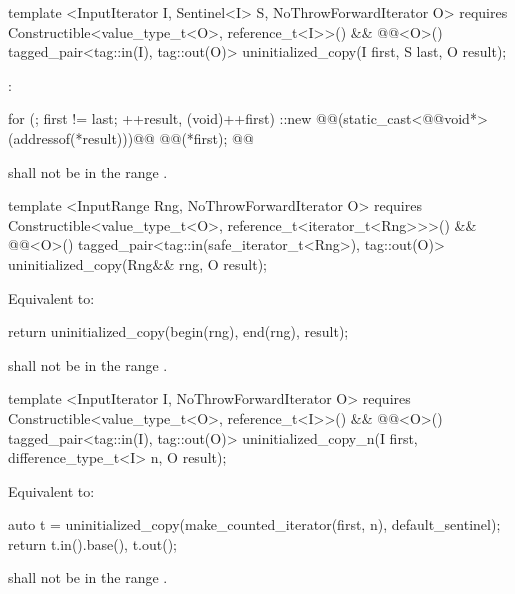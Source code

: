 {\color{addclr}
\begin{codeblock}
template <InputIterator I, Sentinel<I> S, NoThrowForwardIterator O>
  requires Constructible<value_type_t<O>, reference_t<I>>() &&
           @@<O>()
    tagged_pair<tag::in(I), tag::out(O)>
    uninitialized_copy(I first, S last, O result);
\end{codeblock}
} %

\setcounter{Paras}{0}
\pnum
\effects {}:
\begin{codeblock}
        for (; first != last; ++result, (void)++first)
          ::new @@(static_cast<@@void*>(addressof(*result)))@\added{)}@
            @@(*first);
        @@
\end{codeblock}

{\color{addclr}
\requires {} shall not be in the range .

\begin{codeblock}
template <InputRange Rng, NoThrowForwardIterator O>
  requires Constructible<value_type_t<O>, reference_t<iterator_t<Rng>>>() &&
           @@<O>()
    tagged_pair<tag::in(safe_iterator_t<Rng>), tag::out(O)>
    uninitialized_copy(Rng&& rng, O result);
\end{codeblock}

\pnum
\effects Equivalent to:
\begin{codeblock}
        return uninitialized_copy(begin(rng), end(rng), result);
\end{codeblock}

\pnum
\requires {} shall not be in the range .

\begin{codeblock}
template <InputIterator I, NoThrowForwardIterator O>
  requires Constructible<value_type_t<O>, reference_t<I>>() &&
           @@<O>()
    tagged_pair<tag::in(I), tag::out(O)>
    uninitialized_copy_n(I first, difference_type_t<I> n, O result);
\end{codeblock}

\pnum
\effects Equivalent to:
\begin{codeblock}
        auto t = uninitialized_copy(make_counted_iterator(first, n),
                                    default_sentinel{});
        return {t.in().base(), t.out()};
\end{codeblock}

\requires {} shall not be in the range .
} %

